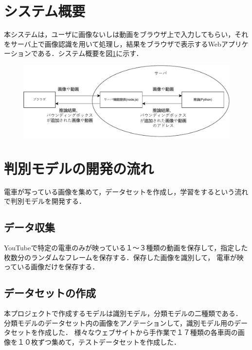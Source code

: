 \begin{multicols*}{2}
\section{システム概要}
本システムは，ユーザに画像ないしは動画をブラウザ上で入力してもらい，それをサーバ上で画像認識を用いて処理し，結果をブラウザで表示するWebアプリケーションである．システム概要を図\ref{abc}に示す．
\begin{figure} %
	\label{abc}
	\centering
	\includegraphics[width=\linewidth]{obj/sys_gaiyou.pdf}
\end{figure}


\section{判別モデルの開発の流れ}
電車が写っている画像を集めて，データセットを作成し，学習をするという流れで判別モデルを開発する．

\subsection{データ収集}
	YouTubeで特定の電車のみが映っている１〜３種類の動画を保存して，指定した枚数分のランダムなフレームを保存する．保存した画像を識別して，	電車が映っている画像だけを保存する．

\subsection{データセットの作成}
本プロジェクトで作成するモデルは識別モデル，分類モデルの二種類である．%
分類モデルのデータセット内の画像をアノテーションして，識別モデル用のデータセットを作成した．
様々なウェブサイトから手作業で１７種類の各車両の画像を１０枚ずつ集めて，テストデータセットを作成した．



\end{multicols*}
